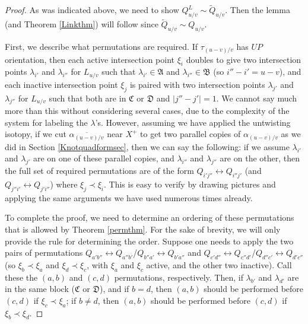 \documentclass[11pt]{amsart}
\theoremstyle{plain}
\theoremstyle{definition}
\theoremstyle{remark}
\begin{document}
\begin{proof}
As was indicated above, we need to show $Q_{u/v}^L\sim \widetilde{Q}_{u/v}$. Then the lemma (and Theorem \ref{Linkthm}) will follow since $\widetilde{Q}_{u/v}\sim Q_{u/v}$.

    First, we describe what permutations are required. If $\tau_{(u-v)/v}$ has $UP$ orientation, then each active intersection point $\xi_i$ doubles to give two intersection points $\lambda_{i'}$ and $\lambda_{i''}$ for $L_{u/v}$ such that $\lambda_{i'}\in \mathfrak{A}$ and $\lambda_{i''}\in\mathfrak{B}$ (so $i''-i'=u-v$), and each inactive intersection point $\xi_j$ is paired with two intersection points $\lambda_{j'}$ and $\lambda_{j''}$ for $L_{u/v}$ such that both are in $\mathfrak{C}$ or $\mathfrak{D}$ and $|j''-j'|=1$. We cannot say much more than this without considering several cases, due to the complexity of the system for labeling the $\lambda$'s. However, assuming we have applied the untwisting isotopy, if we cut $\overline{\alpha_{(u-v)/v}}$ near $X^+$ to get two parallel copies of $\alpha_{(u-v)/v}$ as we did in Section \ref{Knotquadformsec}, then we can say the following: if we assume $\lambda_{i'}$ and $\lambda_{j'}$ are on one of these parallel copies, and $\lambda_{i''}$ and $\lambda_{j''}$ are on the other, then the full set of required permutations are of the form $Q_{i'j''}\leftrightarrow Q_{i''j'}$ (and $Q_{j''i'}\leftrightarrow Q_{j'i''}$) where $\xi_j\prec\xi_i$. This is easy to verify by drawing pictures and applying the same arguments we have used numerous times already.

    To complete the proof, we need to determine an ordering of these permutations that is allowed by Theorem \ref{permthm}. For the sake of brevity, we will only provide the rule for determining the order. Suppose one needs to apply the two pairs of permutations $Q_{a'b''}\leftrightarrow Q_{a''b'}$/$Q_{b''a'}\leftrightarrow Q_{b'a''}$ and $Q_{c'd''}\leftrightarrow Q_{c''d'}$/$Q_{d''c'}\leftrightarrow Q_{d'c''}$ (so $\xi_b\prec \xi_a$ and $\xi_d\prec\xi_c$, with $\xi_a$ and $\xi_c$ active, and the other two inactive). Call these the $(a,b)$ and $(c,d)$ permutations, respectively. Then, if $\lambda_{b'}$ and $\lambda_{d'}$ are in the same block ($\mathfrak{C}$ or $\mathfrak{D}$), and if $b=d$, then $(a,b)$ should be performed before $(c,d)$ if $\xi_c\prec\xi_a$; if $b \neq d$, then $(a,b)$ should be performed before $(c,d)$ if $\xi_b\prec\xi_d$. 
    

\end{proof}
\end{document}
